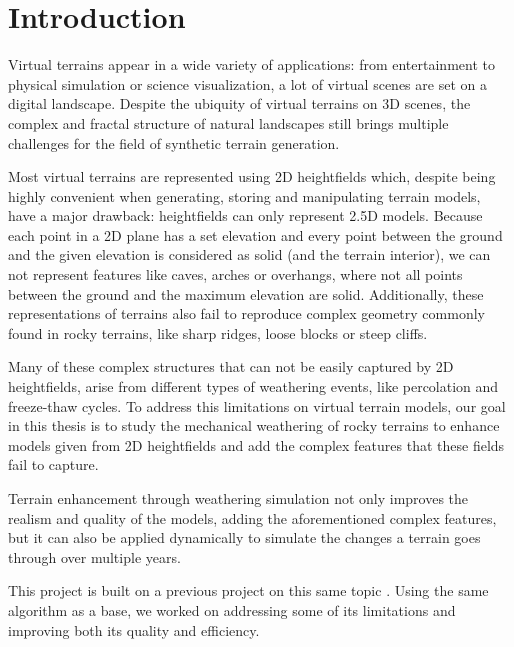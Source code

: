 \chapter{Introduction} \label{intro}

Virtual terrains appear in a wide variety of applications: from entertainment
to physical simulation or science visualization, a lot of virtual scenes 
are set on a digital landscape. Despite the ubiquity of virtual terrains 
on 3D scenes, the complex and fractal structure of natural landscapes still
brings multiple challenges for the field of synthetic terrain generation.

\vspace{10pt}

Most virtual terrains are represented using 2D heightfields which, despite 
being highly convenient when generating, storing and manipulating terrain
models, have a major drawback: heightfields can only represent 2.5D 
models. Because each point in a 2D plane has a set elevation and every 
point between the ground and the given elevation is considered as solid 
(and the terrain interior), we can not represent features like caves, 
arches or overhangs, where not all points between the ground and the 
maximum elevation are solid. Additionally, these representations of terrains 
also fail to reproduce complex geometry commonly found in rocky terrains, 
like sharp ridges, loose blocks or steep cliffs.

\vspace{10pt}

Many of these complex structures that can not be easily captured by 2D 
heightfields, arise from different types of weathering events, like percolation
and freeze-thaw cycles. To address this limitations on virtual terrain models,
our goal in this thesis is to study the mechanical weathering of rocky 
terrains to enhance models given from 2D heightfields and add the complex features 
that these fields fail to capture. 

\vspace{10pt}

Terrain enhancement through weathering simulation not only improves the 
realism and quality of the models, adding the aforementioned complex 
features, but it can also be applied dynamically to simulate the changes 
a terrain goes through over multiple years.

\vspace{10pt}

This project is built on a previous project on this same topic \cite{10.2312:ceig.20241139}. 
Using the same algorithm as a base, we worked on addressing some of its 
limitations and improving both its quality and efficiency.
